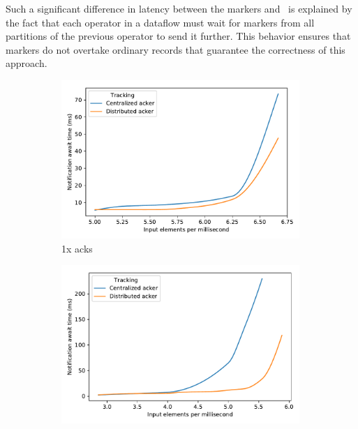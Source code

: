 Such a significant difference in latency between the markers and \tracker\ is explained by the fact that each operator in a dataflow must wait for markers from all partitions of the previous operator to send it further. This behavior ensures that markers do not overtake ordinary records that guarantee the correctness of this approach.

\begin{figure}[t!]
    \begin{subfigure}[b]{0.32\textwidth}
            \includegraphics[width=0.99\textwidth]{pics/scalability_01x.pdf}
            \caption{1x acks}
            \label{1x_acks}
    \end{subfigure}
    \hspace{5mm}
    \begin{subfigure}[b]{0.32\textwidth}
            \includegraphics[width=0.99\textwidth]{pics/scalability_05x.pdf}

\end{subfigure}
\end{figure}

